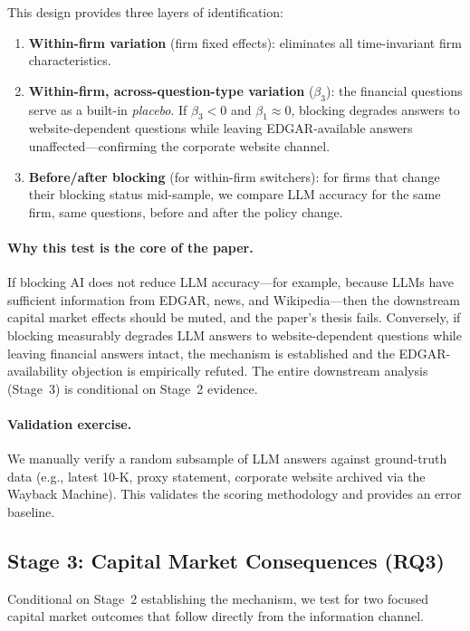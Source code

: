 \documentclass[12pt,a4paper]{article}
\begin{document}
This design provides three layers of identification:
\begin{enumerate}
    \item \textbf{Within-firm variation} (firm fixed effects): eliminates all time-invariant firm characteristics.
    \item \textbf{Within-firm, across-question-type variation} ($\beta_3$): the financial questions serve as a built-in \emph{placebo}. If $\beta_3 < 0$ and $\beta_1 \approx 0$, blocking degrades answers to website-dependent questions while leaving EDGAR-available answers unaffected---confirming the corporate website channel.
    \item \textbf{Before/after blocking} (for within-firm switchers): for firms that change their blocking status mid-sample, we compare LLM accuracy for the same firm, same questions, before and after the policy change.
\end{enumerate}

\paragraph{Why this test is the core of the paper.} If blocking AI does not reduce LLM accuracy---for example, because LLMs have sufficient information from EDGAR, news, and Wikipedia---then the downstream capital market effects should be muted, and the paper's thesis fails. Conversely, if blocking measurably degrades LLM answers to website-dependent questions while leaving financial answers intact, the mechanism is established and the EDGAR-availability objection is empirically refuted. The entire downstream analysis (Stage~3) is conditional on Stage~2 evidence.

\paragraph{Validation exercise.} We manually verify a random subsample of LLM answers against ground-truth data (e.g., latest 10-K, proxy statement, corporate website archived via the Wayback Machine). This validates the scoring methodology and provides an error baseline.

\subsection{Stage 3: Capital Market Consequences (RQ3)}
\label{sec:stage3}

Conditional on Stage~2 establishing the mechanism, we test for two focused capital market outcomes that follow directly from the information channel.
\end{document}
